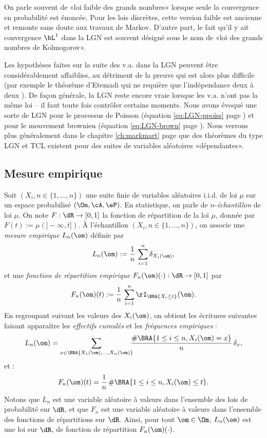 \begin{rem}
  On parle souvent de «loi faible des grands nombres» lorsque seule la
  convergence en probabilité est énoncée. Pour les lois discrètes, cette
  version faible est ancienne et remonte sans doute aux travaux de Markov.
  D'autre part, le fait qu'il y ait convergence $\bL^1$ dans la LGN est
  souvent désigné sous le nom de «loi des grands nombres de Kolmogorov».
\end{rem}

\begin{rem}
  Les hypothèses faites sur la suite des v.a. dans la LGN peuvent être
  considérablement affaiblies, au détriment de la preuve qui est alors plus
  difficile (par exemple le théorème d'Etemadi qui ne requière que
  l'indépendance deux à deux \cite{borkar}). De façon générale, la LGN reste
  encore vraie lorsque les v.a. n'ont pas la même loi -- il faut toute fois
  contrôler certains moments.  Nous avons évoqué une sorte de LGN pour le
  processus de Poisson (équation \eqref{eq:LGN-ppoiss} page
  \pageref{eq:LGN-ppoiss}) et pour le mouvement brownien (équation
  \eqref{eq:LGN-brown} page \pageref{eq:LGN-brown}).  Nous verrons plus
  généralement dans le chapitre \ref{ch:markmart} page \pageref{ch:markmart}
  que des théorèmes du type LGN et TCL existent pour des suites de variables
  aléatoires «dépendantes».
\end{rem}

%
\subsection{Mesure empirique}
%

Soit $(X_i,n\in\{1,\ldots,n\})$ une suite finie de variables aléatoires i.i.d.
de loi $\mu$ sur un espace probabilisé $(\Om,\cA,\eP)$.  En statistique, on
parle de $n$-\emph{échantillon} de loi $\mu$. On note $F:\dR\to[0,1]$ la
fonction de répartition de la loi $\mu$, donnée par $F(t):=\mu(]-\infty,t])$.
À l'échantillon $(X_i,n\in\{1,\ldots,n\})$, on associe une \emph{mesure
  empirique} $L_n(\om)$ définie par
$$
L_n(\om):=\frac{1}{n}\,\sum_{i=1}^n \delta_{X_i(\om)},
$$
et une \emph{fonction de répartition empirique}
$F_n(\om)(\cdot):\dR\to[0,1]$ par
$$
F_n(\om)(t):=\frac{1}{n}\,\sum_{i=1}^n \rI_{\BRA{X_i\leq t}}(\om).
$$
En regroupant suivant les valeurs des $X_i(\om)$, on obtient les écritures
suivantes faisant apparaître les \emph{effectifs cumulés} et les
\emph{fréquences empiriques} :
$$
L_n(\om)
=\sum_{x\in\BRA{X_1(\om),\ldots,X_n(\om)}}
\!\!\!\frac{\#\BRA{1\leq i \leq n, X_i(\om)=x}}{n}\,\delta_x,
$$
et :
$$
F_n(\om)(t)=\frac{1}{n}\, \#\BRA{1\leq i \leq n, X_i(\om)\leq t}.
$$
Notons que $L_n$ est une variable aléatoire à valeurs dans l'ensemble des
lois de probabilité sur $\dR$, et que $F_n$ est une variable aléatoire à
valeurs dans l'ensemble des fonctions de répartitions sur $\dR$. Ainsi, pour
tout $\om\in\Om$, $L_n(\om)$ est une loi sur $\dR$, de fonction de répartition
$F_n(\om)(\cdot)$.


